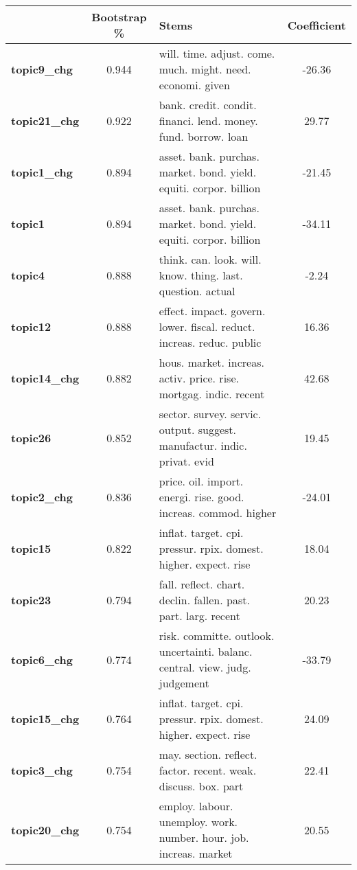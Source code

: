 \begin{tabular}{|l|c|l|c|}
\toprule
{} & Bootstrap \% &                                                                         Stems &  Coefficient \\
\midrule
\textbf{topic9\_chg } &  0.944 &  will. time. adjust. come. much. might. need. economi. given & -26.36 \\
\textbf{topic21\_chg} &  0.922 &  bank. credit. condit. financi. lend. money. fund. borrow. loan &  29.77 \\
\textbf{topic1\_chg } &  0.894 &  asset. bank. purchas. market. bond. yield. equiti. corpor. billion & -21.45 \\
\textbf{topic1     } &  0.894 &  asset. bank. purchas. market. bond. yield. equiti. corpor. billion & -34.11 \\
\textbf{topic4     } &  0.888 &  think. can. look. will. know. thing. last. question. actual & -2.24 \\
\textbf{topic12    } &  0.888 &  effect. impact. govern. lower. fiscal. reduct. increas. reduc. public &  16.36 \\
\textbf{topic14\_chg} &  0.882 &  hous. market. increas. activ. price. rise. mortgag. indic. recent &  42.68 \\
\textbf{topic26    } &  0.852 &  sector. survey. servic. output. suggest. manufactur. indic. privat. evid &  19.45 \\
\textbf{topic2\_chg } &  0.836 &  price. oil. import. energi. rise. good. increas. commod. higher & -24.01 \\
\textbf{topic15    } &  0.822 &  inflat. target. cpi. pressur. rpix. domest. higher. expect. rise &  18.04 \\
\textbf{topic23    } &  0.794 &  fall. reflect. chart. declin. fallen. past. part. larg. recent &  20.23 \\
\textbf{topic6\_chg } &  0.774 &  risk. committe. outlook. uncertainti. balanc. central. view. judg. judgement & -33.79 \\
\textbf{topic15\_chg} &  0.764 &  inflat. target. cpi. pressur. rpix. domest. higher. expect. rise &  24.09 \\
\textbf{topic3\_chg } &  0.754 &  may. section. reflect. factor. recent. weak. discuss. box. part &  22.41 \\
\textbf{topic20\_chg} &  0.754 &  employ. labour. unemploy. work. number. hour. job. increas. market &  20.55 \\
\bottomrule
\end{tabular}
